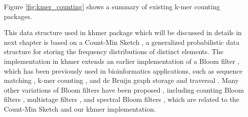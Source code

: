 Figure \ref{fig:kmer_counting} shows a summary of existing k-mer counting
packages.


 This data structure used in khmer package which will be discussed in details
 in next chapter is based on a Count-Min Sketch \cite{Cormode2005}, a
 generalized probabilistic data structure for storing the frequency
 distributions of distinct elements. The implementation in khmer extends an earlier
 implementation of a Bloom filter \cite{Bloom70}, which has been previously
 used in bioinformatics applications, such as sequence matching
 \cite{DBLP:conf/padl/MaldeO09}, k-mer counting \cite{Melsted2011}, and de
 Bruijn graph storage and traversal \cite{Pell2012,Jones:2012aa}. Many other
 variations of Bloom filters have been proposed \cite{BroderM03}, including
 counting Bloom filters \cite{Fan:2000:SCS:343571.343572}, multistage filters
 \cite{DBLP:conf/sigcomm/EstanV02}, and spectral Bloom filters
 \cite{DBLP:conf/sigmod/CohenM03}, which are related to the Count-Min Sketch
 and our khmer implementation.


